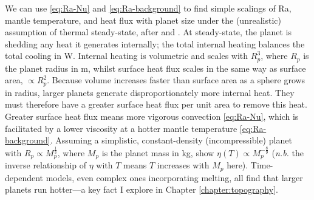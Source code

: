 
We can use \eqref{eq:Ra-Nu} and \eqref{eq:Ra-background} to find simple scalings of Ra, mantle temperature, and heat flux with planet size under the (unrealistic) assumption of thermal steady-state, after \citet{stevenson_styles_2003} and \citet{kite2009geodynamics}. At steady-state, the planet is shedding any heat it generates internally; the total internal heating balances the total cooling in W. Internal heating is volumetric and scales with $R_p^3$, where $R_p$ is the planet radius in m, whilst surface heat flux scales in the same way as surface area, $\propto R_p^2$. Because volume increases faster than surface area as a sphere grows in radius, larger planets generate disproportionately more internal heat. They must therefore have a greater surface heat flux per unit area to remove this heat. Greater surface heat flux means more vigorous convection \eqref{eq:Ra-Nu}, which is facilitated by a lower viscosity at a hotter mantle temperature \eqref{eq:Ra-background}. Assuming a simplistic, constant-density (incompressible) planet with $R_p \propto M_p^{\frac{1}{3}}$, where $M_p$ is the planet mass in kg, \citet{kite2009geodynamics} show $\eta(T) \propto M_p^{-\frac{8}{9}}$ (\textit{n.b.} the inverse relationship of $\eta$ with $T$ means $T$ increases with $M_p$ here). Time-dependent models, even complex ones incorporating melting, all find that larger planets run hotter---a key fact I explore in Chapter \ref{chapter:topography}. %




